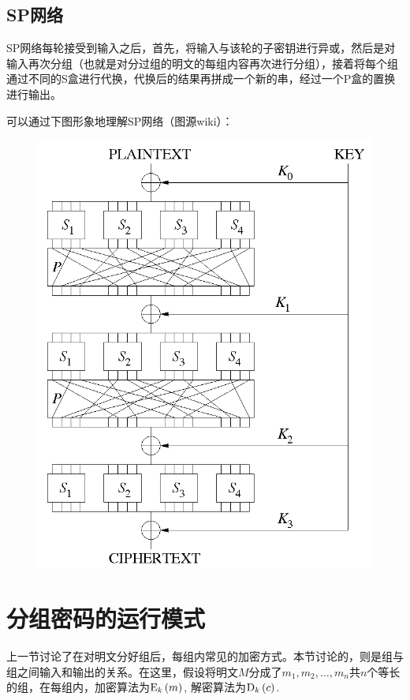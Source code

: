 \subsection{SP网络}
SP网络每轮接受到输入之后，首先，将输入与该轮的子密钥进行异或，然后是对输入再次分组（也就是对分过组的明文的每组内容再次进行分组），接着将每个组通过不同的S盒进行代换，代换后的结果再拼成一个新的串，经过一个P盒的置换进行输出。\par
可以通过下图形象地理解SP网络（图源wiki）：
\begin{figure}[H]
    \centering
    \includegraphics[scale=0.5]{chapters/chapter_4/SPN.png}
\end{figure}
\section{分组密码的运行模式}
上一节讨论了在对明文分好组后，每组内常见的加密方式。本节讨论的，则是组与组之间输入和输出的关系。在这里，假设将明文$M$分成了$m_1, m_2, \ldots, m_n$共$n$个等长的组，在每组内，加密算法为${\mathrm{E}_{k}\left({m}\right)}$, 解密算法为${\mathrm{D}_{k}\left({c}\right)}$.
